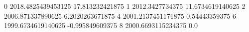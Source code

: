 0 2018.4825439453125 17.813232421875
1 2012.3427734375 11.6734619140625
2 2006.871337890625 6.2020263671875
4 2001.2137451171875 0.54443359375
6 1999.6734619140625 -0.995849609375
8 2000.6693115234375 0.0
